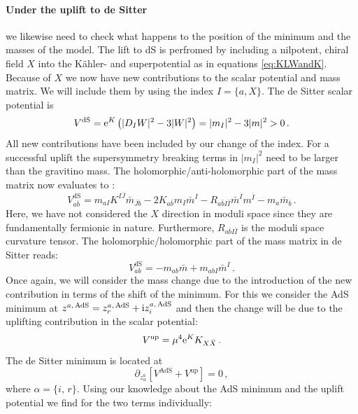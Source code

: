 \documentclass[a4paper,12pt]{report}
\newcommand{\be}{\begin{equation}}
\newcommand{\ee}{\end{equation}}
\def\rmi{{\rm i}}
\def\rme{{\rm e}}
\begin{document}
\paragraph{Under the uplift to de Sitter} we likewise need to check what happens to the position of the minimum and the masses of the model. The lift to dS is perfromed by including a nilpotent, chiral field $X$ into the Kähler- and superpotential as in equations \eqref{eq:KLWandK}. Because of $X$ we now have new contributions to the scalar potential and mass matrix. We will include them by using the index $I = \{a,X\}$. The de Sitter scalar potential is
\be 
V^{\text{dS}} = \rme^K \left(|D_IW|^2-3|W|^2\right) = |m_I|^2 - 3 |m|^2 >0\,.
\ee
All new contributions have been included by our change of the index. For a successful uplift the supersymmetry breaking terms in $|m_I|^2$ need to be larger than the gravitino mass. The holomorphic/anti-holomorphic part of the mass matrix now evaluates to \cite{Denef:2004ze,Kallosh:2014oja}:
\be 
V_{a\bar{b}}^{\text{dS}}=m_{aI} K^{I\bar{J}} \bar{m}_{\bar{J}\bar{b}} - 2 K_{a\bar{b}}m_I \bar{m}^I - R_{a\bar{b}I\bar{I}} \bar{m}^I m^{\bar{I}} - m_a \bar{m}_{\bar{b}}\,.
\label{eq:dSmassmatrix}
\ee
Here, we have not considered the $X$ direction in moduli space since they are fundamentally fermionic in nature. Furthermore, $R_{a\bar{b}I\bar{I}}$ is the moduli space curvature tensor. The holomorphic/holomorphic part of the mass matrix in de Sitter reads:
\be 
V_{ab}^{\text{dS}} = -m_{ab}\bar{m} + m_{abI} \bar{m}^I\,.
\ee
Once again, we will consider the mass change due to the introduction of the new contribution in terms of the shift of the minimum. For this we consider the AdS minimum at $z^{a,\,\text{AdS}} = z^{a,\,\text{AdS}}_{r} + \rmi z^{a,\,\text{AdS}}_{i}$ and then the change will be due to the uplifting contribution in the scalar potential:
\be 
V^{\text{up}} = \mu^4 \rme^K K_{X\bar{X}}\,.
\ee
The de Sitter minimum is located at 
\be 
\partial_{z^ a_{\alpha}} \left[V^{\text{AdS}} + V^{\text{up}}\right] =0\,,
\ee
where $\alpha = \{i,\,r\}$. Using our knowledge about the AdS minimum and the uplift potential we find for the two terms individually:
\end{document}
